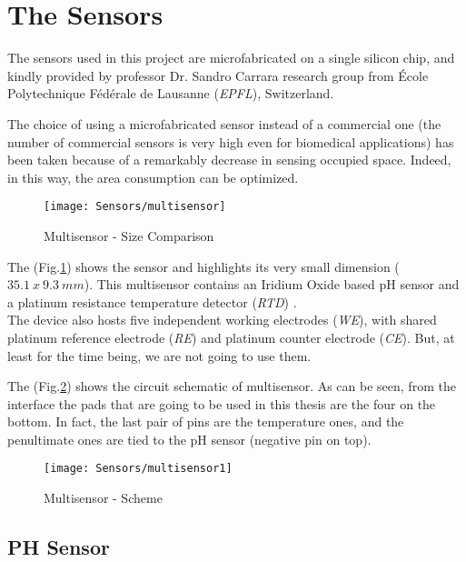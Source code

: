 \label{condi}
\section{The Sensors} 

The sensors used in this project are microfabricated on a single silicon chip, and kindly provided by professor Dr. Sandro Carrara research group from  \'{E}cole
Polytechnique F\'{e}d\'{e}rale de Lausanne (\textit{EPFL}), Switzerland.


The choice of using a microfabricated sensor instead of a commercial one (the number of commercial sensors is very high even for biomedical applications) has been taken because of a remarkably decrease in sensing occupied space. Indeed, in this way, the area consumption can be optimized.

\begin{figure}[h]
	\centering
	\texttt{[image: Sensors/multisensor]}
	\caption{Multisensor - Size Comparison}
	\label{Fig:mulsize}
	
\end{figure}

The (Fig.\ref{Fig:mulsize}) shows the sensor and highlights its very small dimension ($35.1\ x\ 9.3\ mm$). This multisensor contains an Iridium Oxide based pH sensor and a platinum resistance temperature detector (\textit{RTD}) \cite{DFTSA}.\\
The device also hosts five independent working electrodes (\textit{WE}), with shared platinum reference electrode (\textit{RE}) and platinum counter electrode (\textit{CE}). But, at least for the time being, we are not going to use them.

The (Fig.\ref{Fig:mulsensor}) shows the circuit schematic of multisensor. As can be seen, from the interface the pads that are going to be used in this thesis are the four on the bottom. In fact,  the last pair of pins are the temperature ones, and the penultimate ones are tied to the pH sensor (negative pin on top).
 
 \begin{figure}[h]
 	\centering
 	\texttt{[image: Sensors/multisensor1]}
 	\caption{Multisensor - Scheme}
 	\label{Fig:mulsensor}
 	
 \end{figure}
 
 \subsection{PH Sensor}\label{sec:sensorPH}
 
